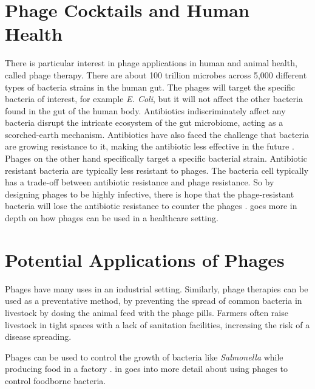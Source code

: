 \section{Phage Cocktails and Human Health}
There is particular interest in phage applications in human and animal health, called phage therapy. 
There are about 100 trillion microbes across 5,000 different types of bacteria strains in the human gut. 
The phages will target the specific bacteria of interest, for example \textit{E. Coli}, but it will not affect the other bacteria found in the gut of the human body. 
Antibiotics indiscriminately affect any bacteria disrupt the intricate ecosystem of the gut microbiome, acting as a scorched-earth mechanism. 
Antibiotics have also faced the challenge that bacteria are growing resistance to it, making the antibiotic less effective in the future \cite{odonkorBacteriaResistanceAntibiotics2011, volkovaEffectsEarlylifePenicillin2021}. 
Phages on the other hand specifically target a specific bacterial strain. 
Antibiotic resistant bacteria are typically less resistant to phages. 
The bacteria cell typically has a trade-off between antibiotic resistance and phage resistance. 
So by designing phages to be highly infective, there is hope that the phage-resistant bacteria will lose the antibiotic resistance to counter the phages \cite{laurePhageResistancemediatedTradeoffs2022, zhaoPhagedrivenCoevolutionReveals2024}. 
 goes more in depth on how phages can be used in a healthcare setting. 

\section{Potential Applications of Phages}
Phages have many uses in an industrial setting. 
Similarly, phage therapies can be used as a preventative method, by preventing the spread of common bacteria in livestock by dosing the animal feed with the phage pills. 
Farmers often raise livestock in tight spaces with a lack of sanitation facilities, increasing the risk of a disease spreading. 
 
Phages can be used to control the growth of bacteria like \textit{Salmonella} while producing food in a factory \cite{sofferBacteriophagesSafelyReduce2016, kowalskaFreshVegetablesFruit2023}. 
 in  goes into more detail about using phages to control foodborne bacteria. 

